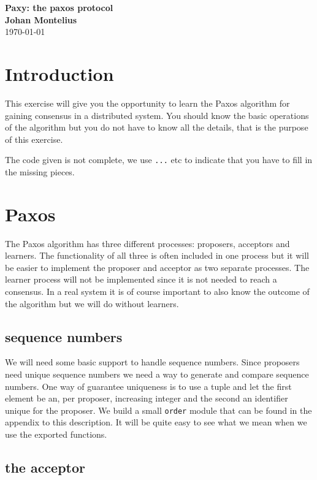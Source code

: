 \documentclass[a4paper,11pt]{article}
\newcommand{\nnsection}[1]{
\section*{#1}
\addcontentsline{toc}{section}{#1}
}
\begin{document}
\begin{center}
\vspace{20pt}
\textbf{\large Paxy: the paxos protocol}\\
\vspace{10pt}
\textbf{Johan Montelius}\\
\vspace{10pt}
\today{}
\end{center}

\nnsection{Introduction}

This exercise will give you the opportunity to learn the Paxos
algorithm for gaining consensus in a distributed system. You should
know the basic operations of the algorithm but you do not have to know
all the details, that is the purpose of this exercise.

The code given is not complete, we use {\tt ...} etc to indicate that
you have to fill in the missing pieces. 

\section{Paxos}

The Paxos algorithm has three different processes: proposers,
acceptors and learners. The functionality of all three is often
included in one process but it will be easier to implement the
proposer and acceptor as two separate processes. The learner process
will not be implemented since it is not needed to reach a
consensus. In a real system it is of course important to also know the
outcome of the algorithm but we will do without learners.

\subsection{sequence numbers}

We will need some basic support to handle sequence numbers. Since
proposers need unique sequence numbers we need a way to generate and
compare sequence numbers. One way of guarantee uniqueness is to use a
tuple and let the first element be an, per proposer, increasing
integer and the second an identifier unique for the proposer. We build
a small {\tt order} module that can be found in the appendix to this
description. It will be quite easy to see what we mean when we use the
exported functions.

\subsection{the acceptor}
\end{document}
